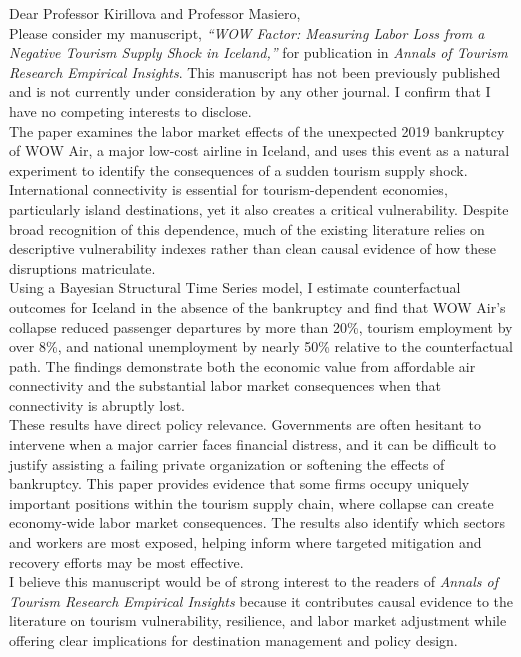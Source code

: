 \documentclass[12pt]{article}
\begin{document}
\noindent
Dear Professor Kirillova and Professor Masiero,\\

\noindent
Please consider my manuscript, \textit{``WOW Factor: Measuring Labor Loss from a Negative Tourism Supply Shock in Iceland,''} for publication in \textit{Annals of Tourism Research Empirical Insights}. This manuscript has not been previously published and is not currently under consideration by any other journal. I confirm that I have no competing interests to disclose.\\

\noindent
The paper examines the labor market effects of the unexpected 2019 bankruptcy of WOW Air, a major low-cost airline in Iceland, and uses this event as a natural experiment to identify the consequences of a sudden tourism supply shock. International connectivity is essential for tourism-dependent economies, particularly island destinations, yet it also creates a critical vulnerability. Despite broad recognition of this dependence, much of the existing literature relies on descriptive vulnerability indexes rather than clean causal evidence of how these disruptions matriculate.\\

\noindent
Using a Bayesian Structural Time Series model, I estimate counterfactual outcomes for Iceland in the absence of the bankruptcy and find that WOW Air’s collapse reduced passenger departures by more than 20\%, tourism employment by over 8\%, and national unemployment by nearly 50\% relative to the counterfactual path. The findings demonstrate both the economic value from affordable air connectivity and the substantial labor market consequences when that connectivity is abruptly lost.\\


\noindent
These results have direct policy relevance. Governments are often hesitant to intervene when a major carrier faces financial distress, and it can be difficult to justify assisting a failing private organization or softening the effects of bankruptcy. This paper provides evidence that some firms occupy uniquely important positions within the tourism supply chain, where collapse can create economy-wide labor market consequences. The results also identify which sectors and workers are most exposed, helping inform where targeted mitigation and recovery efforts may be most effective.\\

\noindent
I believe this manuscript would be of strong interest to the readers of \textit{Annals of Tourism Research Empirical Insights} because it contributes causal evidence to the literature on tourism vulnerability, resilience, and labor market adjustment while offering clear implications for destination management and policy design.\\
\end{document}
